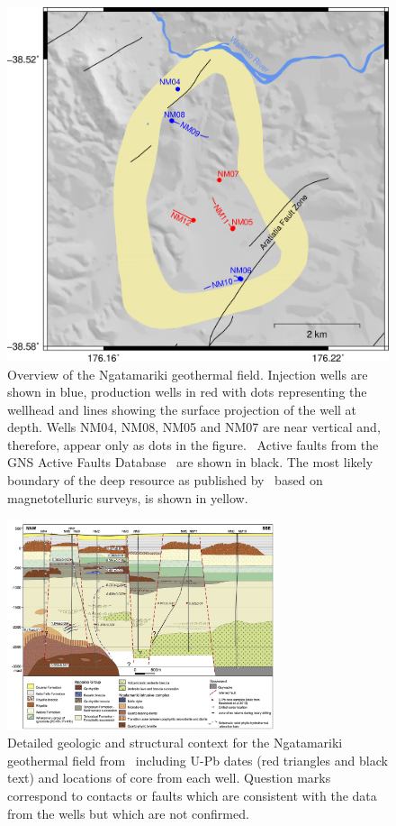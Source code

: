 \begin{figure}[h!]
\begin{center}
\includegraphics[width=0.70\columnwidth]{Chapter_1_Intro/figures/merc_Nga_overview_temps-wells_12-15_no_inset/merc_Nga_overview_temps-wells_12-15_no_inset_original}
\caption{{Overview of the Ngatamariki geothermal field. Injection wells are shown
in blue, production wells in red with dots representing the wellhead and
lines showing the surface projection of the well at depth. Wells NM04,
NM08, NM05 and NM07 are near vertical and, therefore, appear only as
dots in the figure.~ Active faults from the GNS Active Faults
Database~\protect\citet{AFDB} are shown in black. The most likely boundary
of the deep resource as published by~\protect\citet{Boseley_2010} based on
magnetotelluric surveys, is shown in yellow.
{\label{425195}}%
}}
\end{center}
\end{figure}

\begin{figure}
\begin{center}
\includegraphics[width=0.7\textwidth,height=0.7\textheight,keepaspectratio]{Chapter_1_Intro/figures/Chamberfort_2014_fig3/Chamberfort_2014_fig3_original}
\caption{{Detailed geologic and structural context for the Ngatamariki geothermal
field from~\protect\citet{Chambefort_2014} including U-Pb dates (red triangles and
black text) and locations of core from each well. Question marks
correspond to contacts or faults which are consistent with the data from
the wells but which are not confirmed.
{\label{673646}}%
}}
\end{center}
\end{figure}


